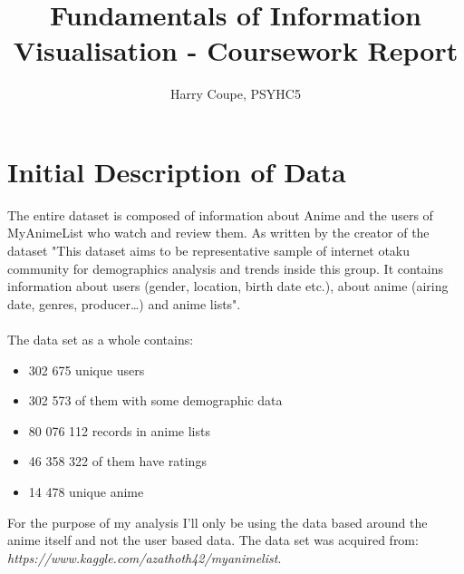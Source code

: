 \documentclass[a4paper]{article}
\begin{document}
	\title{Fundamentals of Information Visualisation - Coursework Report}
	\author{Harry Coupe, PSYHC5\\}
	\maketitle
	
	\section*{Initial Description of Data}
	The entire dataset is composed of information about Anime and the users of MyAnimeList who watch and review them. As written by the creator of the dataset "This dataset aims to be representative sample of internet otaku community for demographics analysis and trends inside this group. It contains information about users (gender, location, birth date etc.), about anime (airing date, genres, producer…) and anime lists".\\
	\\
	The data set as a whole contains:
	\begin{itemize}
		\item 302 675 unique users
		\item 302 573 of them with some demographic data
		\item 80 076 112 records in anime lists
		\item 46 358 322 of them have ratings
		\item 14 478 unique anime
	\end{itemize}
	For the purpose of my analysis I'll only be using the data based around the anime itself and not the user based data. The data set was acquired from: \textit{https://www.kaggle.com/azathoth42/myanimelist}.
	
	\pagebreak
	
\end{document}
